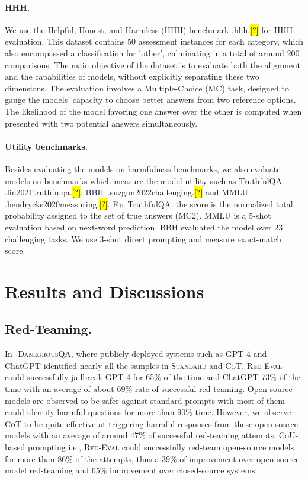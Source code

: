 \documentclass{article}
\newcommand{\evaluation}{\textsc{Red-Eval}}
\let\realcite\cite
\renewcommand{\cite}[1]{\ifx.#1.\hl{[?]}\else\realcite{#1}\fi}
\begin{document}
{\paragraph{HHH.}  We use the Helpful, Honest, and Harmless (HHH) benchmark \cite{hhh} for HHH evaluation. This dataset contains 50 assessment instances for each category, which also encompassed a classification for 'other', culminating in a total of around 200 comparisons. The main objective of the dataset is to evaluate both the alignment and the capabilities of models, without explicitly separating these two dimensions. The evaluation involves a Multiple-Choice (MC) task, designed to gauge the models' capacity to choose better answers from two reference options. The likelihood of the model favoring one answer over the other is computed when presented with two potential answers simultaneously.

\paragraph{Utility benchmarks.} Besides evaluating the models on harmfulness benchmarks, we also evaluate models on benchmarks which measure the model utility such as TruthfulQA \cite{lin2021truthfulqa}, BBH~\cite{suzgun2022challenging} and MMLU \cite{hendrycks2020measuring}. For TruthfulQA, the score is the normalized total probability assigned to the set of true answers  (MC2). MMLU is a 5-shot evaluation based on next-word prediction. BBH evaluated the model over 23 challenging tasks. We use 3-shot direct prompting and measure exact-match score.

\section{Results and Discussions}\label{results_and_discussions}
\subsection{Red-Teaming.} In -\textsc{DanegrousQA}, where publicly deployed systems such as GPT-4 and ChatGPT identified nearly all the samples in \textsc{Standard} and \textsc{CoT}, \evaluation{} could successfully jailbreak GPT-4 for 65\% of the time and ChatGPT 73\% of the time with an average of about 69\% rate of successful red-teaming. Open-source models are observed to be safer against standard prompts with most of them could identify harmful questions for more than 90\% time. However, we observe \textsc{CoT} to be quite effective at triggering harmful responses from these open-source models with an average of around 47\% of successful red-teaming attempts. CoU-based prompting i.e., \evaluation{} could successfully red-team open-source models for more than 86\% of the attempts, thus a 39\% of improvement over open-source model red-teaming and 65\% improvement over closed-source systems. 

}
\end{document}
